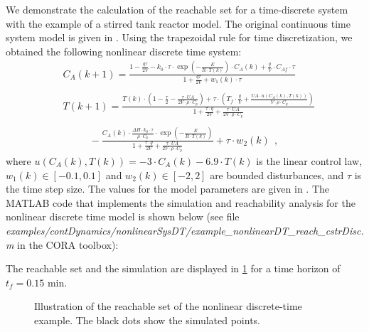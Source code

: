 We demonstrate the calculation of the reachable set for a time-discrete system with the example of a stirred tank reactor model. The original continuous time system model is given in \cite{Bravo2006}. Using the trapezoidal rule for time discretization, we obtained the following nonlinear discrete time system:
\begin{equation}
    \begin{split}
        & C_A(k+1) = \frac{1-\frac{q \tau}{2V} - k_0 \cdot \tau \cdot \exp{\left(-\frac{E}{R \cdot T(k)}\right)} \cdot C_A(k) + \frac{q}{V} \cdot C_{Af} \cdot \tau}{1 + \frac{q\tau}{2V} + w_1(k) \cdot \tau} \\
        & ~~ \\
        & T(k+1) = \frac{T(k) \cdot \left( 1 - \frac{\tau}{2} - \frac{\tau \cdot U A}{2V \cdot \rho \cdot C_p} \right) + \tau \cdot \left( T_f \cdot \frac{q}{V} + \frac{U A \cdot u(C_A(k),T(k))}{V \cdot \rho \cdot C_p} \right)}{1 + \frac{\tau \cdot q}{2V} + \frac{\tau \cdot U A}{2V \cdot \rho \cdot C_p}}\\
        & ~~ \\
        & ~~~~~~~~~~~~ - \frac{ C_A(k) \cdot \frac{\Delta H \cdot k_0 \cdot \tau}{\rho \cdot C_p} \cdot \exp{\left( - \frac{E}{R \cdot T(k)} \right)}}{1 + \frac{\tau \cdot q}{2V} + \frac{\tau \cdot U A}{2V \cdot \rho \cdot C_p}} + \tau \cdot w_2(k) ~~,
    \end{split}
\end{equation}
where $u(C_A(k),T(k)) = -3 \cdot C_A(k) -6.9 \cdot T(k)$ is the linear control law, $w_1(k) \in [-0.1,0.1]$ and $w_2(k) \in [-2,2]$ are bounded disturbances, and $\tau$ is the time step size. The values for the model parameters are given in \cite{Bravo2006}. The MATLAB code that implements the simulation and reachability analysis for the nonlinear discrete time model is shown below (see file \textit{examples/contDynamics/nonlinearSysDT/}\textit{example\_nonlinearDT\_reach\_cstrDisc.m} in the CORA toolbox):

    {\small
}

The reachable set and the simulation are displayed in \cref{fig:exampleNonlinearSysDT} for a time horizon of $t_f = 0.15$ min.
\begin{figure}[htb]
    \centering
    \footnotesize
    \caption{Illustration of the reachable set of the nonlinear discrete-time example. The black dots show the simulated points.}
    \label{fig:exampleNonlinearSysDT}
\end{figure}

